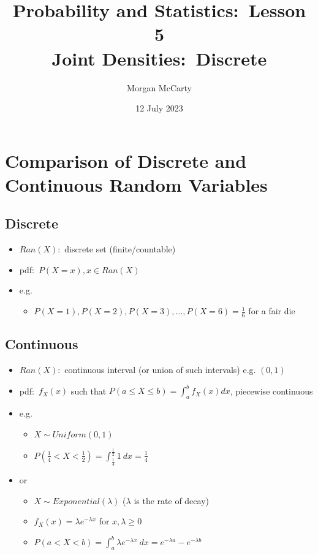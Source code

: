 \documentclass[12pt]{article}
\title{
    Probability and Statistics:\ Lesson 5
    \\Joint Densities:\ Discrete}
\author{Morgan McCarty}
\date{12 July 2023}
\begin{document}
    \maketitle

    \section{Comparison of Discrete and Continuous Random Variables}
        \subsection{Discrete}
            \begin{itemize}
                \item $Ran(X)$:\ discrete set (finite/countable)
                \item pdf:\ $P(X = x), x \in Ran(X)$
                \item e.g.
                \begin{itemize}
                    \item $P(X = 1), P(X = 2), P(X = 3), \ldots, P(X = 6) = \frac{1}{6}$ for a fair die
                \end{itemize}
            \end{itemize}
        \subsection{Continuous}
            \begin{itemize}
                \item $Ran(X)$:\ continuous interval (or union of such intervals) e.g. $(0, 1)$
                \item pdf:\ $f_X(x)$ such that $P(a \leq X \leq b) = \int_{a}^{b} f_X(x) dx$, piecewise continuous
                \item e.g.
                \begin{itemize}
                    \item $X \sim Uniform(0, 1)$
                    \item $P(\frac{1}{4} < X < \frac{1}{2}) = \int_{\frac{1}{4}}^{\frac{1}{2}} 1\ dx = \frac{1}{4}$
                \end{itemize}
                \item or
                \begin{itemize}
                    \item $X \sim Exponential(\lambda)$ ($\lambda$ is the rate of decay)
                    \item $f_X(x) = \lambda e^{-\lambda x}$ for $x, \lambda \geq 0$
                    \item $P(a < X < b) = \int_{a}^{b} \lambda e^{-\lambda x}\ dx = e^{-\lambda a} - e^{-\lambda b}$
                \end{itemize}
            \end{itemize}
\end{document}
